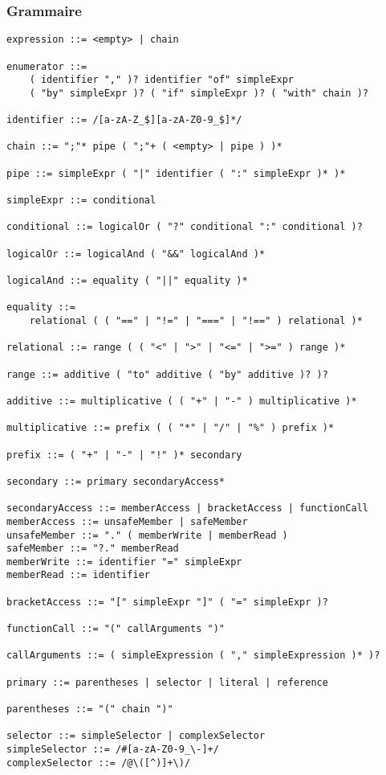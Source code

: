 \subsubsection{Grammaire}
\begin{lstlisting}
expression ::= <empty> | chain

enumerator ::=
	( identifier "," )? identifier "of" simpleExpr
	( "by" simpleExpr )? ( "if" simpleExpr )? ( "with" chain )?

identifier ::= /[a-zA-Z_$][a-zA-Z0-9_$]*/

chain ::= ";"* pipe ( ";"+ ( <empty> | pipe ) )*

pipe ::= simpleExpr ( "|" identifier ( ":" simpleExpr )* )*

simpleExpr ::= conditional

conditional ::= logicalOr ( "?" conditional ":" conditional )?

logicalOr ::= logicalAnd ( "&&" logicalAnd )*

logicalAnd ::= equality ( "||" equality )*

equality ::=
	relational ( ( "==" | "!=" | "===" | "!==" ) relational )*

relational ::= range ( ( "<" | ">" | "<=" | ">=" ) range )*

range ::= additive ( "to" additive ( "by" additive )? )?

additive ::= multiplicative ( ( "+" | "-" ) multiplicative )*

multiplicative ::= prefix ( ( "*" | "/" | "%" ) prefix )*

prefix ::= ( "+" | "-" | "!" )* secondary

secondary ::= primary secondaryAccess*

secondaryAccess ::= memberAccess | bracketAccess | functionCall
memberAccess ::= unsafeMember | safeMember
unsafeMember ::= "." ( memberWrite | memberRead )
safeMember ::= "?." memberRead
memberWrite ::= identifier "=" simpleExpr
memberRead ::= identifier

bracketAccess ::= "[" simpleExpr "]" ( "=" simpleExpr )?

functionCall ::= "(" callArguments ")"

callArguments ::= ( simpleExpression ( "," simpleExpression )* )?

primary ::= parentheses | selector | literal | reference

parentheses ::= "(" chain ")"

selector ::= simpleSelector | complexSelector
simpleSelector ::= /#[a-zA-Z0-9_\-]+/
complexSelector ::= /@\([^)]+\)/


\end{lstlisting}
